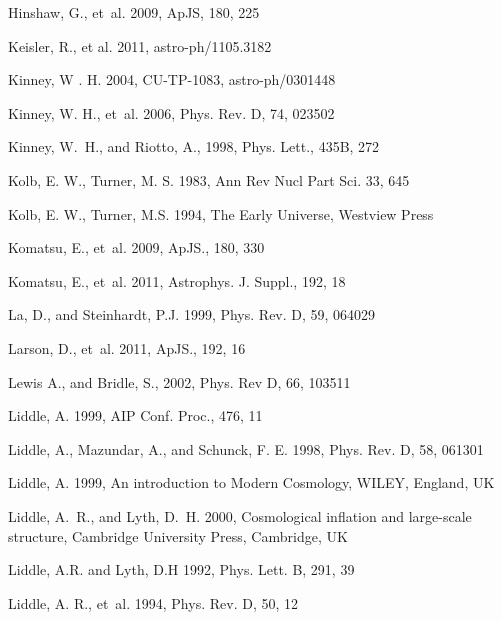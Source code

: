 \documentclass{rmaa}
\begin{document}
\begin{thebibliography}
Hinshaw, G., et~al. 2009, ApJS, 180, 225

  Keisler, R., et al. 2011, astro-ph/1105.3182  
 
  Kinney, W . H. 2004, CU-TP-1083, astro-ph/0301448
 
 Kinney, W. H.,  et~al. 2006, Phys. Rev. D, 74, 023502

 Kinney, W.~H., and {Riotto}, A.,  1998, Phys. Lett., 435B, 272

Kolb, E. W., Turner, M. S. 1983, Ann Rev Nucl Part Sci. 33, 645
  
Kolb, E. W., Turner, M.S. 1994, The Early Universe, Westview Press  

  Komatsu, E., et~al. 2009, ApJS., 180, 330 
  
Komatsu, E., et~al. 2011, Astrophys. J. Suppl., 192, 18

  La, D., and {Steinhardt}, P.J.  1999, Phys. Rev. D, 59, 064029
 
Larson, D., et~al. 2011, ApJS., 192, 16

Lewis A., and Bridle, S., 2002, Phys. Rev D, 66, 103511 
   
  Liddle, A. 1999, AIP Conf. Proc., 476, 11

 Liddle, A.,  {Mazundar,} A., and {Schunck,} F. E. 1998, Phys. Rev. D, 58, 061301  

Liddle, A. 1999, An introduction to Modern Cosmology, WILEY, England, UK

 Liddle, A.~R., and  Lyth, D.~H. 2000, Cosmological inflation and large-scale structure,
  Cambridge University Press, Cambridge, UK 

 Liddle, A.R. and Lyth, D.H 1992, Phys. Lett. B, 291, 39

  Liddle, A. R., et~al. 1994, Phys. Rev. D, 50, 12
  

\end{thebibliography}
\end{document}
